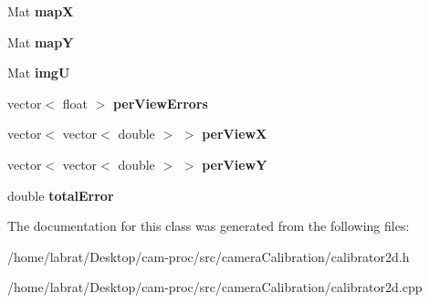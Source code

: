 \begin{DoxyCompactItemize}
\item 
Mat {\bfseries mapX}\hypertarget{classcalibrator2d_adc87f58a631730999b9b02567796faba}{}\label{classcalibrator2d_adc87f58a631730999b9b02567796faba}

\item 
Mat {\bfseries mapY}\hypertarget{classcalibrator2d_a55c46dbb0e93fa42dc9ab53e91a893a7}{}\label{classcalibrator2d_a55c46dbb0e93fa42dc9ab53e91a893a7}

\item 
Mat {\bfseries imgU}\hypertarget{classcalibrator2d_a41559c6c5924c0df9bfda1ce354d9f03}{}\label{classcalibrator2d_a41559c6c5924c0df9bfda1ce354d9f03}

\item 
vector$<$ float $>$ {\bfseries per\+View\+Errors}\hypertarget{classcalibrator2d_a66bff8908a002c37e915454b99b0738d}{}\label{classcalibrator2d_a66bff8908a002c37e915454b99b0738d}

\item 
vector$<$ vector$<$ double $>$ $>$ {\bfseries per\+ViewX}\hypertarget{classcalibrator2d_aa8bd4480acaf1cb660f1c28b60f2da28}{}\label{classcalibrator2d_aa8bd4480acaf1cb660f1c28b60f2da28}

\item 
vector$<$ vector$<$ double $>$ $>$ {\bfseries per\+ViewY}\hypertarget{classcalibrator2d_a9f423a039647698693269ec55d63cdd9}{}\label{classcalibrator2d_a9f423a039647698693269ec55d63cdd9}

\item 
double {\bfseries total\+Error}\hypertarget{classcalibrator2d_a77f577df3c8ad43cab3d751c621188e5}{}\label{classcalibrator2d_a77f577df3c8ad43cab3d751c621188e5}

\end{DoxyCompactItemize}


The documentation for this class was generated from the following files\+:\begin{DoxyCompactItemize}
\item 
/home/labrat/\+Desktop/cam-\/proc/src/camera\+Calibration/calibrator2d.\+h\item 
/home/labrat/\+Desktop/cam-\/proc/src/camera\+Calibration/calibrator2d.\+cpp\end{DoxyCompactItemize}
